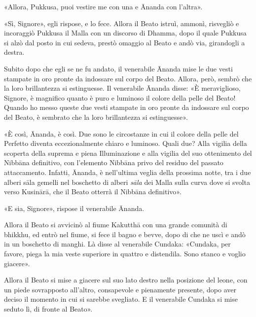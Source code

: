 «Allora, Pukkusa, puoi vestire me con una e Ānanda con l’altra».

«Sì, Signore», egli rispose, e lo fece. Allora il Beato istruì, ammonì,
risvegliò e incoraggiò Pukkusa il Malla con un discorso di Dhamma, dopo il quale
Pukkusa si alzò dal posto in cui sedeva, prestò omaggio al Beato e andò via,
girandogli a destra.

Subito dopo che egli se ne fu andato, il venerabile Ānanda mise le due vesti
stampate in oro pronte da indossare sul corpo del Beato. Allora, però, sembrò
che la loro brillantezza si estinguesse. Il venerabile Ānanda disse: «È
meraviglioso, Signore, è magnifico quanto è puro e luminoso il colore della
pelle del Beato! Quando ho messo queste due vesti stampate in oro pronte da
indossare sul corpo del Beato, è sembrato che la loro brillantezza si
estinguesse».

«È così, Ānanda, è così. Due sono le circostanze in cui il colore della pelle
del Perfetto diventa eccezionalmente chiaro e luminoso. Quali due? Alla vigilia
della scoperta della suprema e piena Illuminazione e alla vigilia del suo
ottenimento del Nibbāna definitivo, con l’elemento Nibbāna privo del residuo del
passato attaccamento. Infatti, Ānanda, è nell’ultima veglia della prossima
notte, tra i due alberi sāla gemelli nel boschetto di alberi \emph{sāla} dei
Malla sulla curva dove si svolta verso Kusinārā, che il Beato otterrà il Nibbāna
definitivo».

«E sia, Signore», rispose il venerabile Ānanda.

Allora il Beato si avvicinò al fiume Kakutthā con una grande comunità di
bhikkhu, ed entrò nel fiume, si fece il bagno e bevve, dopo di che ne uscì e
andò in un boschetto di manghi. Là disse al venerabile Cundaka: «Cundaka, per
favore, piega la mia veste superiore in quattro e distendila. Sono stanco e
voglio giacere».

Allora il Beato si mise a giacere sul suo lato destro nella posizione del leone,
con un piede sovrapposto all’altro, consapevole e pienamente presente, dopo aver
deciso il momento in cui si sarebbe svegliato. E il venerabile Cundaka si mise
seduto lì, di fronte al Beato».


